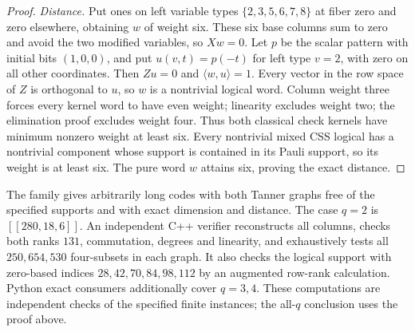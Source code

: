 \documentclass[11pt]{article}
\begin{document}
\begin{proof}
\emph{Distance.} Put ones on left variable types $\{2,3,5,6,7,8\}$ at fiber zero
and zero elsewhere, obtaining $w$ of weight six. These six base columns sum
to zero and avoid the two modified variables, so $Xw=0$. Let $p$ be the scalar
pattern with initial bits $(1,0,0)$, and put $u(v,t)=p(-t)$ for left type $v=2$,
with zero on all other coordinates. Then $Zu=0$ and $\langle w,u\rangle=1$.
Every vector in the row space of $Z$ is orthogonal to $u$, so $w$ is a nontrivial
logical word. Column weight three forces every kernel word to have even weight;
linearity excludes weight two; the elimination proof excludes weight four.
Thus both classical check kernels have minimum nonzero weight at least six.
Every nontrivial mixed CSS logical has a nontrivial component whose support
is contained in its Pauli support, so its weight is at least six. The pure word
$w$ attains six, proving the exact distance.
\end{proof}

The family gives arbitrarily long codes with both Tanner graphs free of the
specified supports and with exact dimension and distance. The case $q=2$ is
$[[280,18,6]]$. An independent C++ verifier reconstructs all
columns, checks both ranks $131$, commutation, degrees and linearity, and
exhaustively tests all $250{,}654{,}530$ four-subsets in each graph. It also checks
the logical support with zero-based indices $28,42,70,84,98,112$ by an augmented
row-rank calculation. Python exact consumers additionally cover $q=3,4$.
These computations are independent checks of the specified finite instances;
the all-$q$ conclusion uses the proof above.
\end{document}
